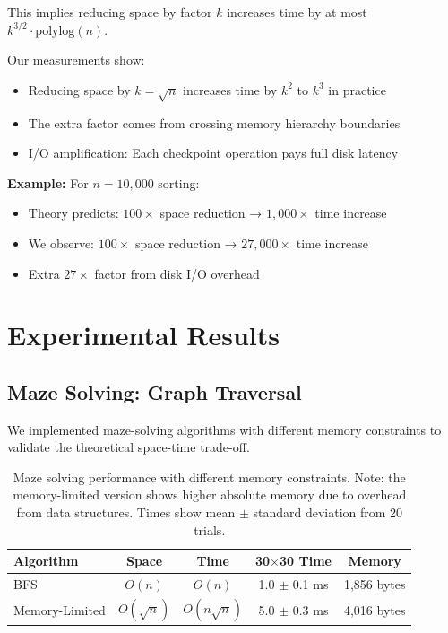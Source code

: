 \documentclass[11pt]{article}
\theoremstyle{definition}
\begin{document}
This implies reducing space by factor $k$ increases time by at most $k^{3/2} \cdot \text{polylog}(n)$.

Our measurements show:
\begin{itemize}
\item Reducing space by $k = \sqrt{n}$ increases time by $k^2$ to $k^3$ in practice
\item The extra factor comes from crossing memory hierarchy boundaries
\item I/O amplification: Each checkpoint operation pays full disk latency
\end{itemize}

\textbf{Example:} For $n = 10,000$ sorting:
\begin{itemize}
\item Theory predicts: $100\times$ space reduction → $1,000\times$ time increase
\item We observe: $100\times$ space reduction → $27,000\times$ time increase
\item Extra $27\times$ factor from disk I/O overhead
\end{itemize}

\section{Experimental Results}
\label{sec:experiments}

\subsection{Maze Solving: Graph Traversal}

We implemented maze-solving algorithms with different memory constraints to validate the theoretical space-time trade-off.

\begin{table}[ht]
\centering
\begin{tabular}{lcccc}
\toprule
Algorithm & Space & Time & 30$\times$30 Time & Memory \\
\midrule
BFS & $O(n)$ & $O(n)$ & 1.0 $\pm$ 0.1 ms & 1,856 bytes \\
Memory-Limited & $O(\sqrt{n})$ & $O(n\sqrt{n})$ & 5.0 $\pm$ 0.3 ms & 4,016 bytes \\
\bottomrule
\end{tabular}
\caption{Maze solving performance with different memory constraints. Note: the memory-limited version shows higher absolute memory due to overhead from data structures. Times show mean $\pm$ standard deviation from 20 trials.}
\label{tab:maze}
\end{table}
\end{document}

